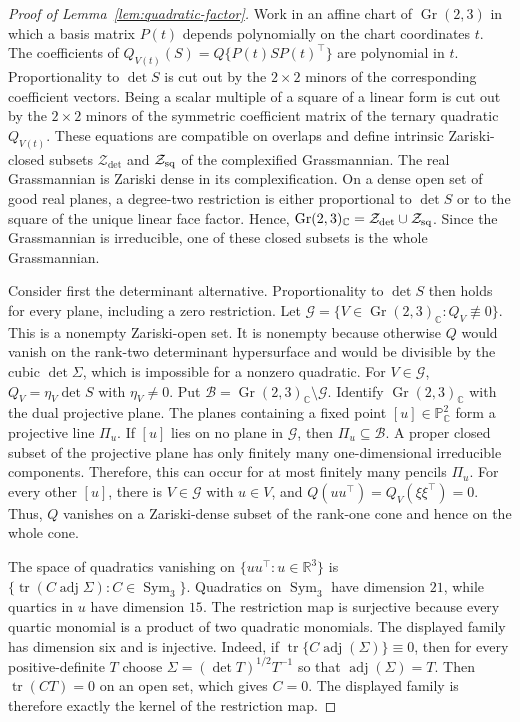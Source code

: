 \documentclass[12pt,a4paper]{article}
\theoremstyle{plain}
\theoremstyle{definition}
\newcommand{\C}{\mathbb{C}}
\newcommand{\R}{\mathbb{R}}
\newcommand{\Sym}{\operatorname{Sym}}
\newcommand{\tr}{\operatorname{tr}}
\newcommand{\adjm}{\operatorname{adj}}
\newcommand{\Gr}{\operatorname{Gr}}
\begin{document}
\begin{proof}[Proof of Lemma~\ref{lem:quadratic-factor}]
    Work in an affine chart of $\Gr(2,3)$ in which a basis matrix $P(t)$ depends polynomially on the chart coordinates $t$.
    The coefficients of $Q_{V(t)}(S)=Q\{P(t)SP(t)^\top\}$ are polynomial in $t$.
    Proportionality to $\det S$ is cut out by the $2\times2$ minors of the corresponding coefficient vectors.
    Being a scalar multiple of a square of a linear form is cut out by the $2\times2$ minors of the symmetric coefficient matrix of the ternary quadratic $Q_{V(t)}$.
    These equations are compatible on overlaps and define intrinsic Zariski-closed subsets $\mathcal{Z}_{\det}$ and $\mathcal{Z}_{\rm sq}$ of the complexified Grassmannian.
    The real Grassmannian is Zariski dense in its complexification.
    On a dense open set of good real planes, a degree-two restriction is either proportional to $\det S$ or to the square of the unique linear face factor.
    Hence, $\Gr(2,3)_\C=\mathcal{Z}_{\det}\cup\mathcal{Z}_{\rm sq}$.
    Since the Grassmannian is irreducible, one of these closed subsets is the whole Grassmannian.

    Consider first the determinant alternative.
    Proportionality to $\det S$ then holds for every plane, including a zero restriction.
    Let $\mathcal{G}=\{V\in\Gr(2,3)_\C:Q_V\not\equiv0\}$.
    This is a nonempty Zariski-open set.
    It is nonempty because otherwise $Q$ would vanish on the rank-two determinant hypersurface and would be divisible by the cubic $\det\Sigma$, which is impossible for a nonzero quadratic.
    For $V\in\mathcal{G}$, $Q_V=\eta_V\det S$ with $\eta_V\ne0$.
    Put $\mathcal{B}=\Gr(2,3)_\C\setminus\mathcal{G}$.
    Identify $\Gr(2,3)_\C$ with the dual projective plane.
    The planes containing a fixed point $[u]\in\mathbb{P}^2_\C$ form a projective line $\Pi_u$.
    If $[u]$ lies on no plane in $\mathcal{G}$, then $\Pi_u\subseteq\mathcal{B}$.
    A proper closed subset of the projective plane has only finitely many one-dimensional irreducible components.
    Therefore, this can occur for at most finitely many pencils $\Pi_u$.
    For every other $[u]$, there is $V\in\mathcal{G}$ with $u\in V$, and $Q(uu^\top)=Q_V(\xi\xi^\top)=0$.
    Thus, $Q$ vanishes on a Zariski-dense subset of the rank-one cone and hence on the whole cone.

    The space of quadratics vanishing on $\{uu^\top:u\in\R^3\}$ is $\{\tr(C\adjm\Sigma):C\in\Sym_3\}$.
    Quadratics on $\Sym_3$ have dimension $21$, while quartics in $u$ have dimension $15$.
    The restriction map is surjective because every quartic monomial is a product of two quadratic monomials.
    The displayed family has dimension six and is injective.
    Indeed, if $\tr\{C\adjm(\Sigma)\}\equiv0$, then for every positive-definite $T$ choose $\Sigma=(\det T)^{1/2}T^{-1}$ so that $\adjm(\Sigma)=T$.
    Then $\tr(CT)=0$ on an open set, which gives $C=0$.
    The displayed family is therefore exactly the kernel of the restriction map.


\end{proof}
\end{document}
